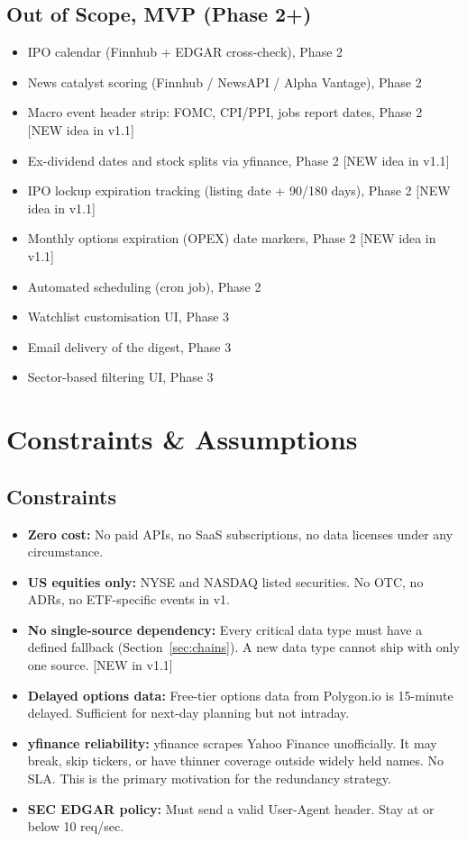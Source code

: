 \documentclass[11pt]{article}
\begin{document}
\subsection{Out of Scope, MVP (Phase 2+)}
\begin{itemize}
  \item IPO calendar (Finnhub + EDGAR cross-check), Phase 2
  \item News catalyst scoring (Finnhub / NewsAPI / Alpha Vantage), Phase 2
  \item Macro event header strip: FOMC, CPI/PPI, jobs report dates, Phase 2 \hfill [NEW idea in v1.1]
  \item Ex-dividend dates and stock splits via yfinance, Phase 2 \hfill [NEW idea in v1.1]
  \item IPO lockup expiration tracking (listing date + 90/180 days), Phase 2 \hfill [NEW idea in v1.1]
  \item Monthly options expiration (OPEX) date markers, Phase 2 \hfill [NEW idea in v1.1]
  \item Automated scheduling (cron job), Phase 2
  \item Watchlist customisation UI, Phase 3
  \item Email delivery of the digest, Phase 3
  \item Sector-based filtering UI, Phase 3
\end{itemize}

\section{Constraints \& Assumptions}

\subsection{Constraints}
\begin{itemize}
  \item \textbf{Zero cost:} No paid APIs, no SaaS subscriptions, no data licenses under any circumstance.
  \item \textbf{US equities only:} NYSE and NASDAQ listed securities. No OTC, no ADRs, no ETF-specific events in v1.
  \item \textbf{No single-source dependency:} Every critical data type must have a defined fallback (Section~\ref{sec:chains}). A new data type cannot ship with only one source. \hfill [NEW in v1.1]
  \item \textbf{Delayed options data:} Free-tier options data from Polygon.io is 15-minute delayed. Sufficient for next-day planning but not intraday.
  \item \textbf{yfinance reliability:} yfinance scrapes Yahoo Finance unofficially. It may break, skip tickers, or have thinner coverage outside widely held names. No SLA. This is the primary motivation for the redundancy strategy.
  \item \textbf{SEC EDGAR policy:} Must send a valid User-Agent header. Stay at or below 10 req/sec.
\end{itemize}
\end{document}
